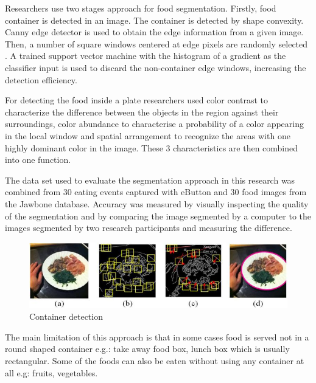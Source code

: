 Researchers use two stages approach for food segmentation. Firstly, food container is detected in an image. The container is detected by shape convexity.  Canny edge detector is used to obtain the edge information from a given image.
Then, a number of square windows centered at edge pixels are randomly selected \label{fig:2}. A trained support vector machine with the histogram of a gradient as the classifier input is used to discard the non-container edge windows, increasing the detection efficiency. 

For detecting the food inside a plate researchers used color contrast to characterize the difference between the objects in the region against their surroundings, color abundance to characterise a probability of a color appearing in the local window and spatial arrangement to recognize the areas with one highly dominant color in the image. These 3 characteristics are then combined into one function.

The data set used to evaluate the segmentation approach in this research was combined from 30 eating events captured with eButton and 30 food images from the Jawbone database. Accuracy was measured by visually inspecting the quality of the segmentation and by comparing the image segmented by a computer to the images segmented by two research participants and measuring the difference. 



\begin{figure}[ht]
\includegraphics{Figures/2/segm_03.jpg}
\caption{Container detection}
\label{fig:3}
\end{figure}

The main limitation of this approach is that in some cases food is served not in a round shaped container e.g.: take away food box, lunch box which is usually rectangular. Some of the foods can also be eaten without using any container at all e.g: fruits, vegetables.

